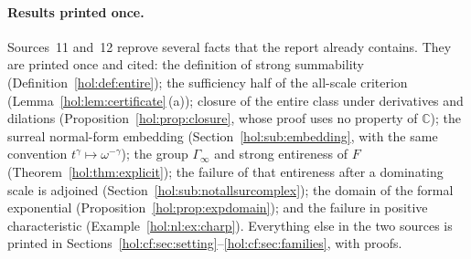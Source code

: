 \documentclass[11pt]{article}
\numberwithin{equation}{section}
\theoremstyle{definition}
\theoremstyle{remark}
\newcommand{\C}{\mathbb C}
\begin{document}
\paragraph{Results printed once.}
Sources~11 and~12 reprove several facts that the report already contains.
They are printed once and cited: the definition of strong summability
(Definition~\ref{hol:def:entire}); the sufficiency half of the all-scale
criterion (Lemma~\ref{hol:lem:certificate}\,(a)); closure of the entire class
under derivatives and dilations (Proposition~\ref{hol:prop:closure}, whose
proof uses no property of $\C$); the surreal normal-form embedding
(Section~\ref{hol:sub:embedding}, with the same convention
$t^\gamma\mapsto\omega^{-\gamma}$); the group $\Gamma_\infty$ and strong
entireness of $F$ (Theorem~\ref{hol:thm:explicit}); the failure of that
entireness after a dominating scale is adjoined
(Section~\ref{hol:sub:notallsurcomplex}); the domain of the formal exponential
(Proposition~\ref{hol:prop:expdomain}); and the failure in positive
characteristic (Example~\ref{hol:nl:ex:charp}). Everything else in the two
sources is printed in
Sections~\ref{hol:cf:sec:setting}--\ref{hol:cf:sec:families}, with proofs.
\end{document}
